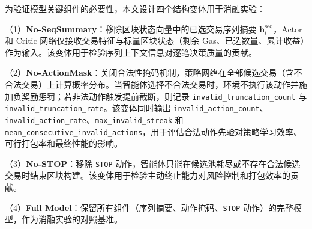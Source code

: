 为验证模型关键组件的必要性，本文设计四个结构变体用于消融实验：

（1）\textbf{No-SeqSummary}：移除区块状态向量中的已选交易序列摘要 $\mathbf{h}_t^{\text{seq}}$，Actor 和 Critic 网络仅接收交易特征与标量区块状态（剩余 Gas、已选数量、累计收益）作为输入。该变体用于检验序列上下文信息对逐笔决策质量的贡献。

（2）\textbf{No-ActionMask}：关闭合法性掩码机制，策略网络在全部候选交易（含不合法交易）上计算概率分布。当智能体选择不合法交易时，环境不执行该动作并施加负奖励惩罚；若非法动作触发提前截断，则记录 \texttt{invalid\_truncation\_count} 与 \texttt{invalid\_truncation\_rate}。该变体同时输出 \texttt{invalid\_action\_count}、\texttt{invalid\_action\_rate}、\texttt{max\_invalid\_streak} 和 \texttt{mean\_consecutive\_invalid\_actions}，用于评估合法动作先验对策略学习效率、可行打包率和最终性能的影响。



（3）\textbf{No-STOP}：移除 \texttt{STOP} 动作，智能体只能在候选池耗尽或不存在合法候选交易时结束区块构建。该变体用于检验主动终止能力对风险控制和打包效率的贡献。

（4）\textbf{Full Model}：保留所有组件（序列摘要、动作掩码、\texttt{STOP} 动作）的完整模型，作为消融实验的对照基准。
